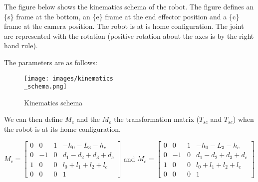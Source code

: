 \bigbreak

The figure below shows the kinematics schema of the robot. The figure defines an \{s\} frame at the bottom, an \{e\} frame at the end effector position and a \{c\} frame at the camera position. The robot is at is home configuration. The joint are represented with the rotation (positive rotation about the axes is by the right hand rule).

\bigbreak 

The parameters are as follows: 

\begin{center}
\end{center}

\begin{figure}[ht]
    \centering
    \texttt{[image: images/kinematics\\\_schema.png]}
    \caption{Kinematics schema}
    \label{fig:mesh10}
\end{figure}
\FloatBarrier

\bigbreak

We can then define $M_c$ and the $M_e$ the transformation matrix ($T_{sc}$ and $T_{se}$) when the robot is at its home configuration. 

\bigbreak
$
M_c = \begin{bmatrix}
    0 & 0 & 1 & -h_0-L_3-h_c\\
    0 & -1 & 0 & d_1-d_2+d_3+d_c\\
    1 & 0 & 0 & l_0+l_1+l_2+l_c\\
    0 & 0 & 0 & 1
\end{bmatrix}
$
and
$
M_e = \begin{bmatrix}
    0 & 0 & 1 & -h_0-L_3-h_c\\
    0 & -1 & 0 & d_1-d_2+d_3+d_c\\
    1 & 0 & 0 & l_0+l_1+l_2+l_c\\
    0 & 0 & 0 & 1
\end{bmatrix}
$


